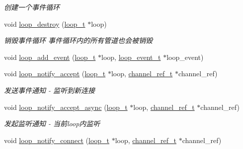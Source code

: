 \begin{DoxyCompactItemize}
\begin{DoxyCompactList}\small\item\em 创建一个事件循环 \end{DoxyCompactList}\item 
void \hyperlink{a00105_ga921fd5e5e16a73de123e81baab187a0a_ga921fd5e5e16a73de123e81baab187a0a}{loop\+\_\+destroy} (\hyperlink{a00051_a9c3ad1cd2de83e09f3a7b59fa82c94ee_a9c3ad1cd2de83e09f3a7b59fa82c94ee}{loop\+\_\+t} $\ast$loop)
\begin{DoxyCompactList}\small\item\em 销毁事件循环 事件循环内的所有管道也会被销毁 \end{DoxyCompactList}\item 
void \hyperlink{a00069_a1697e4a52238e6e4512caac6c34b9abb_a1697e4a52238e6e4512caac6c34b9abb}{loop\+\_\+add\+\_\+event} (\hyperlink{a00051_a9c3ad1cd2de83e09f3a7b59fa82c94ee_a9c3ad1cd2de83e09f3a7b59fa82c94ee}{loop\+\_\+t} $\ast$loop, \hyperlink{a00069_a1095ee772017ce29dcac0987c456709e_a1095ee772017ce29dcac0987c456709e}{loop\+\_\+event\+\_\+t} $\ast$loop\+\_\+event)
\item 
void \hyperlink{a00069_a61e9eb6eeaaad4d1d655beba05bb8440_a61e9eb6eeaaad4d1d655beba05bb8440}{loop\+\_\+notify\+\_\+accept} (\hyperlink{a00051_a9c3ad1cd2de83e09f3a7b59fa82c94ee_a9c3ad1cd2de83e09f3a7b59fa82c94ee}{loop\+\_\+t} $\ast$loop, \hyperlink{a00051_a151271c9d188ef28d4d24bb81dcc1263_a151271c9d188ef28d4d24bb81dcc1263}{channel\+\_\+ref\+\_\+t} $\ast$channel\+\_\+ref)
\begin{DoxyCompactList}\small\item\em 发送事件通知 -\/ 监听到新连接 \end{DoxyCompactList}\item 
void \hyperlink{a00069_a846d409d477916f7d5cb0da240ef000d_a846d409d477916f7d5cb0da240ef000d}{loop\+\_\+notify\+\_\+accept\+\_\+async} (\hyperlink{a00051_a9c3ad1cd2de83e09f3a7b59fa82c94ee_a9c3ad1cd2de83e09f3a7b59fa82c94ee}{loop\+\_\+t} $\ast$loop, \hyperlink{a00051_a151271c9d188ef28d4d24bb81dcc1263_a151271c9d188ef28d4d24bb81dcc1263}{channel\+\_\+ref\+\_\+t} $\ast$channel\+\_\+ref)
\begin{DoxyCompactList}\small\item\em 发起监听通知 -\/ 当前loop内监听 \end{DoxyCompactList}\item 
void \hyperlink{a00069_a32f076ad9889fd658c51d7dd0a300ed0_a32f076ad9889fd658c51d7dd0a300ed0}{loop\+\_\+notify\+\_\+connect} (\hyperlink{a00051_a9c3ad1cd2de83e09f3a7b59fa82c94ee_a9c3ad1cd2de83e09f3a7b59fa82c94ee}{loop\+\_\+t} $\ast$loop, \hyperlink{a00051_a151271c9d188ef28d4d24bb81dcc1263_a151271c9d188ef28d4d24bb81dcc1263}{channel\+\_\+ref\+\_\+t} $\ast$channel\+\_\+ref)

\end{DoxyCompactItemize}

